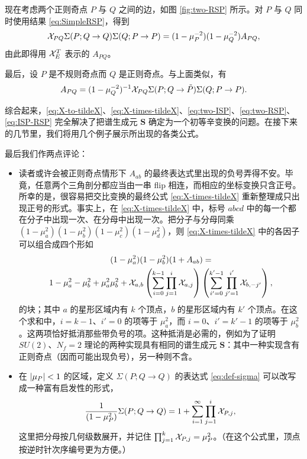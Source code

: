 
现在考虑两个正则奇点 $P$ 与 $Q$ 之间的边，如图 \ref{fig:two-RSP} 所示。对 $P$ 与 $Q$ 同时使用结果 \eqref{eq:SimpleRSP}，得到
\begin{equation}\label{eq:two-RSP}
\mathcal{X}_{PQ}\Sigma(P;Q\to Q)\Sigma(Q;P\to P)=(1-\mu_P^{-2})(1-\mu_Q^{-2})A_{PQ},
\end{equation}
由此即得用 $\mathcal{X}_E^T$ 表示的 $A_{PQ}$。

最后，设 $P$ 是不规则奇点而 $Q$ 是正则奇点。与上面类似，有
\begin{equation}\label{eq:ISP-RSP}
A_{PQ}=(1-\mu_Q^{-2})^{-1}\mathcal{X}_{PQ}\Sigma(P;Q\to\tilde P)\Sigma(Q;P\to P).
\end{equation}

综合起来，\eqref{eq:X-to-tildeX}、\eqref{eq:X-times-tildeX}、\eqref{eq:two-ISP}、\eqref{eq:two-RSP}、\eqref{eq:ISP-RSP} 完全解决了把谱生成元 $\mathbf S$ 确定为一个初等辛变换的问题。在接下来的几节里，我们将用几个例子展示所出现的各类公式。

最后我们作两点评论：

\begin{itemize}
\item 读者或许会被正则奇点情形下 $A_{ab}$ 的最终表达式里出现的负号弄得不安。毕竟，任意两个三角剖分都应当由一串 flip 相连，而相应的坐标变换只含正号。所幸的是，很容易把交比变换的最终公式 \eqref{eq:X-times-tildeX} 重新整理成只出现正号的形式。事实上，在 \eqref{eq:X-times-tildeX} 中，标号 $abcd$ 中的每一个都在分子中出现一次、在分母中出现一次。把分子与分母同乘 $(1-\mu_a^{2})(1-\mu_b^{2})(1-\mu_c^{2})(1-\mu_d^{2})$，则 \eqref{eq:X-times-tildeX} 中的各因子可以组合成四个形如
\begin{multline}
(1-\mu_a^{2})(1-\mu_b^{2})(1+A_{ab}) = \\
1-\mu_a^{2}-\mu_b^{2}+\mu_a^{2}\mu_b^{2}+\mathcal{X}_{a,b}\left(\sum_{i=0}^{k-1}\prod_{j=1}^i\mathcal{X}_{a,j}\right)\left(\sum_{i'=0}^{k'-1}\prod_{j'=1}^{i'}\mathcal{X}_{b,-j'}\right),
\end{multline}
的块；其中 $a$ 的星形区域内有 $k$ 个顶点，$b$ 的星形区域内有 $k'$ 个顶点。在这个求和中，$i=k-1$、$i'=0$ 的项等于 $\mu_a^{2}$，而 $i=0$、$i'=k'-1$ 的项等于 $\mu_b^{2}$。这两项恰好抵消那些带负号的项。这种抵消是必需的，例如为了证明 $SU(2)$、$N_f=2$ 理论的两种实现具有相同的谱生成元 $\mathbf S$：其中一种实现含有正则奇点（因而可能出现负号），另一种则不含。

\item 在 $\lvert \mu_P \rvert<1$ 的区域，定义 $\Sigma(P;Q\to Q)$ 的表达式 \eqref{eq:def-sigma} 可以改写成一种富有启发性的形式，
\begin{equation}
\frac{1}{(1-\mu_P^{2})}\Sigma(P;Q\to Q)=1+\sum_{i=1}^{\infty}\prod_{j=1}^i\mathcal{X}_{P,j},
\end{equation}
这里把分母按几何级数展开，并记住 $\prod_{j=1}^k\mathcal{X}_{P,j}=\mu_P^{2}$。（在这个公式里，顶点按逆时针次序编号更为方便。）
\end{itemize}

